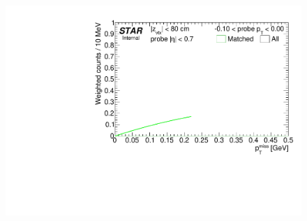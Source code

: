 \begin{figure}[h!]
{  \includegraphics[width=\linewidth,page=11]{graphics/correctionsToEff/TOF_tagAndProbe/Fitting_effVsPt_mc.CPT2.pdf}

}
\end{figure}
